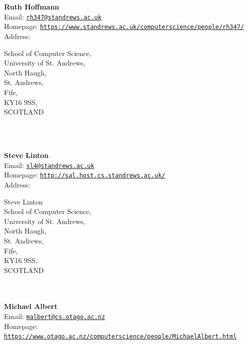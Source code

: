 \documentclass[a4paper,11pt]{report}
\begin{document}
\begin{titlepage}
\mbox{}\\
{\mbox{}\\
\small \noindent \textbf{ Ruth Hoffmann\\
    }  Email: \href{mailto://rh347@st-andrews.ac.uk} {\texttt{rh347@st\texttt{}andrews.ac.uk}}\\
  Homepage: \href{https://www.st-andrews.ac.uk/computer-science/people/rh347/} {\texttt{https://www.st\texttt{}andrews.ac.uk/computer\texttt{}science/people/rh347/}}\\
  Address: \begin{minipage}[t]{8cm}\noindent
 School of Computer Science,\\
 University of St. Andrews,\\
 North Haugh,\\
 St. Andrews,\\
 Fife,\\
 KY16 9SS,\\
 SCOTLAND\\
 \end{minipage}
}\\
{\mbox{}\\
\small \noindent \textbf{ Steve Linton\\
    }  Email: \href{mailto://sl4@st-andrews.ac.uk} {\texttt{sl4@st\texttt{}andrews.ac.uk}}\\
  Homepage: \href{http://sal.host.cs.st-andrews.ac.uk/} {\texttt{http://sal.host.cs.st\texttt{}andrews.ac.uk/}}\\
  Address: \begin{minipage}[t]{8cm}\noindent
 Steve Linton\\
 School of Computer Science,\\
 University of St. Andrews,\\
 North Haugh,\\
 St. Andrews,\\
 Fife,\\
 KY16 9SS,\\
 SCOTLAND\\
 \end{minipage}
}\\
{\mbox{}\\
\small \noindent \textbf{ Michael Albert\\
    }  Email: \href{mailto://malbert@cs.otago.ac.nz} {\texttt{malbert@cs.otago.ac.nz}}\\
  Homepage: \href{https://www.otago.ac.nz/computer-science/people/Michael_Albert.html} {\texttt{https://www.otago.ac.nz/computer\texttt{}science/people/Michael{\textunderscore}Albert.html}}\\
}
\end{titlepage}
\end{document}
